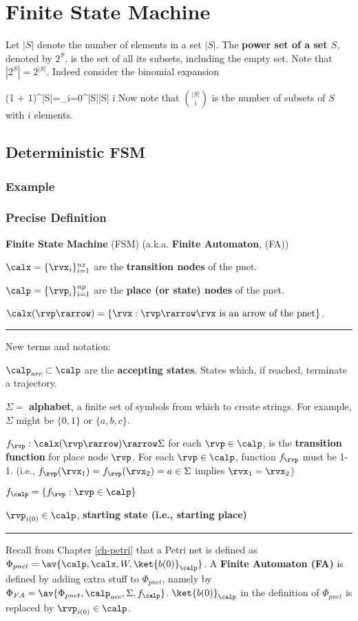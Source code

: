 \chapter{Finite State Machine}
\label{ch-finite-state}

Let $|S|$ denote the number of elements
in a set $|S|$.
The {\bf power set of a set $S$}, denoted by $2^S$,
is the set of all its subsets, including the empty set.
Note that $|2^S|=2^{|S|}$. Indeed
consider the binomial expansion

\beq
(1 + 1)^{|S|}=\sum_{i=0}^{|S|}{|S| \choose i}
\eeq
Now note that  ${|S|\choose i}$
is the number of subsets of $S$ with $i$ elements.

\section{Deterministic FSM}

\subsection{Example}
\subsection{Precise Definition}
{\bf Finite State Machine} (FSM) (a.k.a. {\bf Finite Automaton}, (FA))

$\calx =\{\rvx_i\}_{i=1}^{nx}$ are the {\bf transition nodes} of the pnet.

$\calp =\{\rvp_i\}_{i=1}^{np}$ are the {\bf place (or state) nodes} of the pnet.

$\calx(\rvp\rarrow)=\{\rvx: \rvp\rarrow\rvx \text{ is an arrow of the pnet}\}$.

\hrule
New terms and notation:

$\calp_{acc}\subset \calp$ are the 
{\bf accepting states}. States which, if reached, terminate a trajectory.

$\Sigma=$ {\bf alphabet}, a finite set of symbols
from which to create strings. For example,
$\Sigma$ might be $\{0, 1\}$ or $\{a, b, c\}$.

$f_\rvp:\calx(\rvp\rarrow)\rarrow \Sigma$ for each
$\rvp\in \calp$,  is the 
{\bf transition function} for place node $\rvp$. For each $\rvp\in \calp$,
 function
$f_\rvp$
must be 1-1. (i.e., 
$f_\rvp(\rvx_1)=f_\rvp(\rvx_2)=a\in\Sigma$
implies $\rvx_1=\rvx_2$)

$f_\calp =
\{f_\rvp: \rvp\in \calp\}$

$\rvp_{i(0)}\in \calp$, {\bf starting state (i.e., starting place)}
\hrule
Recall from Chapter \ref{ch-petri} that a Petri net is defined as $\Phi_{pnet} = \av{\calp, \calx, W,\ket{b(0)}_\calp}$.
A {\bf Finite Automaton (FA)}
is defined by adding extra stuff to
$\Phi_{pnet}$, namely by
$\Phi_{FA}=\av{\Phi_{pnet},\calp_{acc}, \Sigma, f_\calp}$.
$\ket{b(0)}_\calp$ in the definition
of $\Phi_{pnet}$ is replaced by
$\rvp_{i(0)}\in\calp$.

